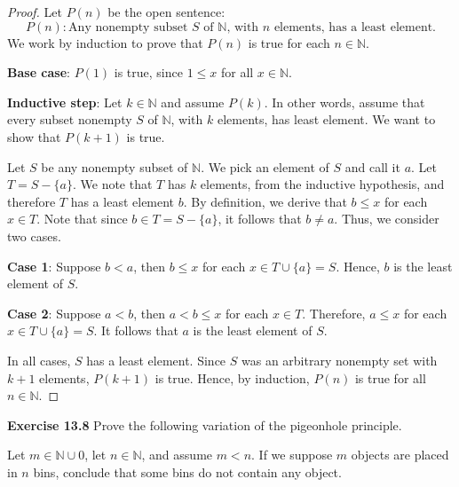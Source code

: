 \documentclass[12pt,oneside]{article}
\newenvironment{exercise}[1]{\vspace{.1in}\noindent\textbf{Exercise #1 \hspace{.05em}}}{}
\newcommand{\N}{\mathbb{N}}
\begin{document}
\begin{proof}
Let $P(n)$ be the open sentence:
\[P(n): \text{Any nonempty subset $S$ of $\N$, with $n$ elements, has a least element.}\]
We work by induction to prove that $P(n)$ is true for each $n \in \N$.

\textbf{Base case}: $P(1)$ is true, since $1 \leq x$ for all $x \in \N$.

\textbf{Inductive step}: Let $k \in \N$ and assume $P(k)$. In other words, assume that every subset nonempty $S$ of $\N$, with $k$ elements, has least element. We want to show that $P(k + 1)$ is true.

Let $S$ be any nonempty subset of $\N$. We pick an element of $S$ and call it $a$. Let $T = S - \{a\}$. We note that $T$ has $k$ elements, from the inductive hypothesis, and therefore $T$ has a least element $b$. By definition, we derive that $b \leq x$ for each $x \in T$. Note that since $b \in T = S - \{a\}$, it follows that $b \neq a$. Thus, we consider two cases.

\textbf{Case 1}: Suppose $b < a$, then $b \leq x$ for each $x \in T \cup \{a\} = S$. Hence, $b$ is the least element of $S$.

\textbf{Case 2}: Suppose $a < b$, then $a < b \leq x$ for each $x \in T$. Therefore, $a \leq x$ for each $x \in T \cup \{a\} = S$. It follows that $a$ is the least element of $S$.

In all cases, $S$ has a least element. Since $S$ was an arbitrary nonempty set with $k + 1$ elements, $P(k+1)$ is true. Hence, by induction, $P(n)$ is true for all $n \in \N$.
\end{proof}



\begin{exercise}{13.8}
Prove the following variation of the pigeonhole principle.

Let $m \in \N \cup {0}$, let $n \in \N$, and assume $m < n$. If we suppose $m$ objects are placed in $n$ bins, conclude that some bins do not contain any object.
\end{exercise}
\end{document}
